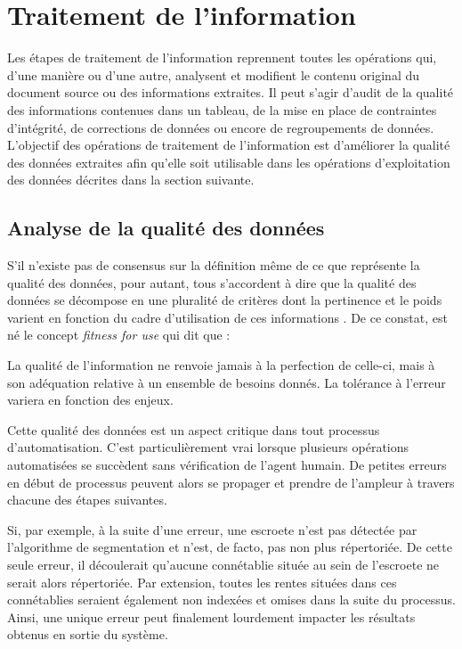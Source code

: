 \section{Traitement de l'information}
Les étapes de traitement de l'information reprennent toutes les opérations qui, d'une manière ou d'une autre, analysent et modifient le contenu original du document source ou des informations extraites. Il peut s'agir d'audit de la qualité des informations contenues dans un tableau, de la mise en place de contraintes d'intégrité, de corrections de données ou encore de regroupements de données. 
L'objectif des opérations de traitement de l'information est d'améliorer la qualité des données extraites afin qu'elle soit utilisable dans les opérations d'exploitation des données décrites dans la section suivante.

\subsection{Analyse de la qualité des données}
S'il n'existe pas de consensus sur la définition même de ce que représente la qualité des données, pour autant, tous s'accordent à dire que la qualité des données se décompose en une pluralité de critères dont la pertinence et le poids varient en fonction du cadre d'utilisation de ces informations \parencite{berti-equille_qualite_2004}. De ce constat, est né le concept \textit{fitness for use} qui dit que :
\begin{displayquote}
    \og La qualité de l'information ne renvoie jamais à la perfection de celle-ci, mais à son adéquation relative à un ensemble de besoins donnés. La tolérance à l'erreur variera en fonction des enjeux.\fg{} 
\end{displayquote} 
\vspace{0,5cm}

Cette qualité des données est un aspect critique dans tout processus d'automatisation. C'est particulièrement vrai lorsque plusieurs opérations automatisées se succèdent sans vérification de l'agent humain. De petites erreurs en début de processus peuvent alors se propager et prendre de l'ampleur à travers chacune des étapes suivantes. 

Si, par exemple, à la suite d'une erreur, une escroete n'est pas détectée par l'algorithme de segmentation et n'est, de facto,  pas non plus répertoriée. De cette seule erreur, il découlerait qu'aucune connétablie située au sein de l'escroete ne serait alors répertoriée. Par extension, toutes les rentes situées dans ces connétablies seraient également non indexées et omises dans la suite du processus. Ainsi, une unique erreur peut finalement lourdement impacter les résultats obtenus en sortie du système.

